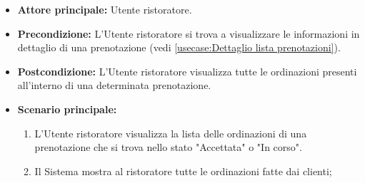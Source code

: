 \label{usecase:Consultazione lista ordinazioni}
\begin{itemize}
	\item \textbf{Attore principale:} Utente ristoratore.

	\item \textbf{Precondizione:} L'Utente ristoratore si trova a visualizzare le informazioni in dettaglio di una prenotazione (vedi \autoref{usecase:Dettaglio lista prenotazioni}).

	\item \textbf{Postcondizione:} L'Utente ristoratore visualizza tutte le ordinazioni presenti all'interno di una determinata prenotazione.

	\item \textbf{Scenario principale:}
	      \begin{enumerate}
		      \item L'Utente ristoratore visualizza la lista delle ordinazioni di una prenotazione che si trova nello stato "Accettata" o "In corso".
		      \item Il Sistema mostra al ristoratore tutte le ordinazioni fatte dai clienti;
	      \end{enumerate}
\end{itemize}


